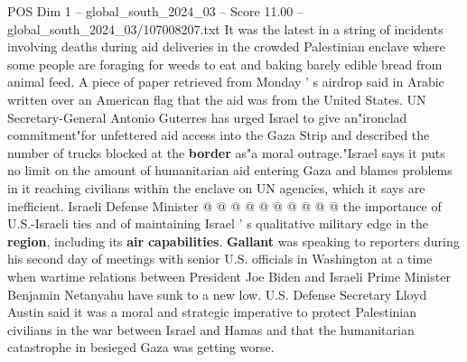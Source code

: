 \begin{textsample}{POS Dim 1 – global\_south\_2024\_03 – Score 11.00 – global\_south\_2024\_03/107008207.txt}
It was the latest in a string of incidents involving deaths during aid deliveries in the crowded Palestinian enclave where some people are foraging for weeds to eat and baking barely edible bread from animal feed.
A piece of paper retrieved from Monday ' s airdrop said in Arabic written over an American flag that the aid was from the United States.
UN Secretary-General Antonio Guterres has urged Israel to give an"ironclad commitment"for unfettered aid access into the Gaza Strip and described the number of trucks blocked at the \textbf{border} as"a moral outrage."Israel says it puts no limit on the amount of humanitarian aid entering Gaza and blames problems in it reaching civilians within the enclave on UN agencies, which it says are inefficient.
Israeli Defense Minister @ @ @ @ @ @ @ @ @ @ the importance of U.S.-Israeli ties and of maintaining Israel ' s qualitative military edge in the \textbf{region}, including its \textbf{air} \textbf{capabilities}. \textbf{Gallant} was speaking to reporters during his second day of meetings with senior U.S. officials in Washington at a time when wartime relations between President Joe Biden and Israeli Prime Minister Benjamin Netanyahu have sunk to a new low.
U.S.
Defense Secretary Lloyd Austin said it was a moral and strategic imperative to protect Palestinian civilians in the war between Israel and Hamas and that the humanitarian catastrophe in besieged Gaza was getting worse.

\end{textsample}
